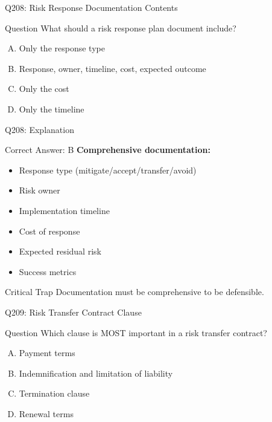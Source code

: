 \documentclass{beamer}
\begin{document}
	\begin{frame}{Q208: Risk Response Documentation Contents}
		\begin{block}{Question}
			What should a risk response plan document include?
		\end{block}
		\begin{enumerate}[(A)]
			\item Only the response type
			\item Response, owner, timeline, cost, expected outcome
			\item Only the cost
			\item Only the timeline
		\end{enumerate}
	\end{frame}
	
	\begin{frame}{Q208: Explanation}
		\begin{block}{Correct Answer: B}
			\textbf{Comprehensive documentation:}
			\begin{itemize}
				\item Response type (mitigate/accept/transfer/avoid)
				\item Risk owner
				\item Implementation timeline
				\item Cost of response
				\item Expected residual risk
				\item Success metrics
			\end{itemize}
		\end{block}
		\begin{alertblock}{Critical Trap}
			Documentation must be comprehensive to be defensible.
		\end{alertblock}
	\end{frame}
	
	\begin{frame}{Q209: Risk Transfer Contract Clause}
		\begin{block}{Question}
			Which clause is MOST important in a risk transfer contract?
		\end{block}
		\begin{enumerate}[(A)]
			\item Payment terms
			\item Indemnification and limitation of liability
			\item Termination clause
			\item Renewal terms
		\end{enumerate}
	\end{frame}
	
\end{document}
